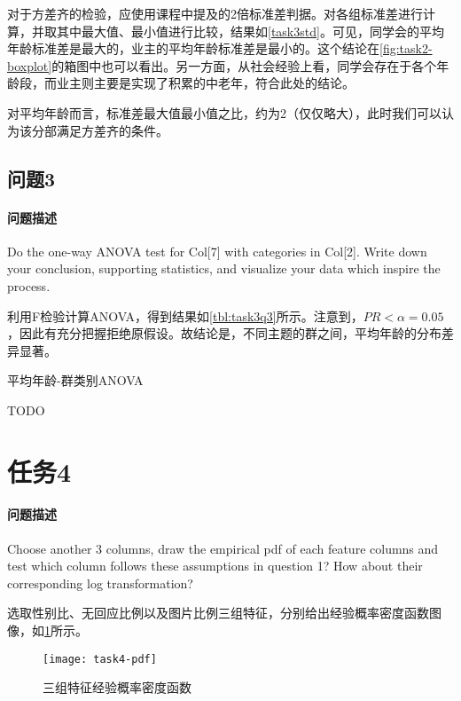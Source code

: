 \documentclass[a4paper,12pt]{article}
\begin{document}
    对于方差齐的检验，应使用课程中提及的2倍标准差判据。对各组标准差进行计算，并取其中最大值、最小值进行比较，结果如\cref{task3std}。可见，同学会的平均年龄标准差是最大的，业主的平均年龄标准差是最小的。这个结论在\cref{fig:task2-boxplot}的箱图中也可以看出。另一方面，从社会经验上看，同学会存在于各个年龄段，而业主则主要是实现了积累的中老年，符合此处的结论。
    

    对平均年龄而言，标准差最大值最小值之比，约为2（仅仅略大），此时我们可以认为该分部满足方差齐的条件。

    \subsection{问题3}
    \paragraph{问题描述} Do the one-way ANOVA test for Col[7] with categories in Col[2]. Write down your conclusion, supporting statistics, and visualize your data which inspire the process.

    利用F检验计算ANOVA，得到结果如\cref{tbl:task3q3}所示。注意到，$PR<\alpha=0.05$，因此有充分把握拒绝原假设。故结论是，不同主题的群之间，平均年龄的分布差异显著。
    \begin{table}
      \centering
      \caption{平均年龄-群类别ANOVA}
      \label{tbl:task3q3}
      
    \end{table}
    TODO

    \section{任务4} %
    \paragraph{问题描述} Choose another 3 columns, draw the empirical pdf of each feature columns and test which column follows these assumptions in question 1? How about their corresponding log transformation?

    选取性别比、无回应比例以及图片比例三组特征，分别给出经验概率密度函数图像，如\cref{fig:gnn}所示。

    \begin{figure}[htbp]
        \centering
        \texttt{[image: task4-pdf]}
        \caption{三组特征经验概率密度函数}
        \label{fig:gnn}
    \end{figure}
\end{document}
